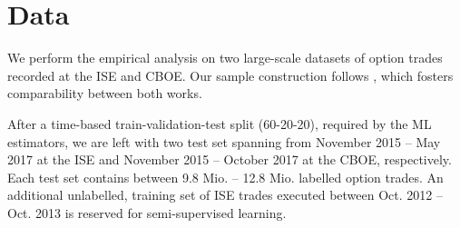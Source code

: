 









\section{Data}


We perform the empirical analysis on two large-scale datasets of option trades recorded at the \gls{ISE} and \gls{CBOE}. Our sample construction follows \textcite[][]{grauerOptionTradeClassification2022}, which fosters comparability between both works. 

After a time-based train-validation-test split (60-20-20), required by the \gls{ML} estimators, we are left with two test set spanning from November 2015 -- May 2017 at the \gls{ISE} and November 2015 -- October 2017 at the \gls{CBOE}, respectively. Each test set contains between 9.8 Mio. --  12.8 Mio. labelled option trades. An additional unlabelled, training set of \gls{ISE} trades executed between Oct. 2012 -- Oct. 2013 is reserved for semi-supervised learning.


